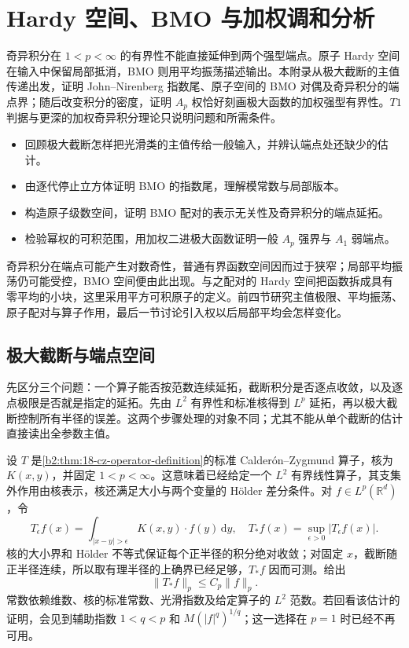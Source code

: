 \chapter{Hardy 空间、BMO 与加权调和分析}
\label{b2:app:C}

\begin{chapterabstract}
奇异积分在 \(1<p<\infty\) 的有界性不能直接延伸到两个强型端点。原子 Hardy 空间在输入中保留局部抵消，BMO 则用平均振荡描述输出。本附录从极大截断的主值传递出发，证明 John--Nirenberg 指数尾、原子空间的 BMO 对偶及奇异积分的端点界；随后改变积分的密度，证明 \(A_p\) 权恰好刻画极大函数的加权强型有界性。\(T1\) 判据与更深的加权奇异积分理论只说明问题和所需条件。
\end{chapterabstract}

\begin{learninggoals}\begin{itemize}
\item\label{b2:item:app-C-goal-1}回顾极大截断怎样把光滑类的主值传给一般输入，并辨认端点处还缺少的估计。
\item\label{b2:item:app-C-goal-2}由逐代停止立方体证明 BMO 的指数尾，理解模常数与局部版本。
\item\label{b2:item:app-C-goal-3}构造原子级数空间，证明 BMO 配对的表示无关性及奇异积分的端点延拓。
\item\label{b2:item:app-C-goal-4}检验幂权的可积范围，用加权二进极大函数证明一般 \(A_p\) 强界与 \(A_1\) 弱端点。
\end{itemize}\end{learninggoals}

奇异积分在端点可能产生对数奇性，普通有界函数空间因而过于狭窄；局部平均振荡仍可能受控，BMO 空间便由此出现。与之配对的 Hardy 空间把函数拆成具有零平均的小块，这里采用平方可积原子的定义。前四节研究主值极限、平均振荡、原子配对与算子作用，最后一节讨论引入权以后局部平均会怎样变化。

\section{极大截断与端点空间}
\label{b2:sec:app-C-1}

先区分三个问题：一个算子能否按范数连续延拓，截断积分是否逐点收敛，以及逐点极限是否就是指定的延拓。先由 \(L^2\) 有界性和标准核得到 \(L^p\) 延拓，再以极大截断控制所有半径的误差。这两个步骤处理的对象不同；尤其不能从单个截断的估计直接读出全参数主值。

\ProseParagraphBreak

设 \(T\) 是\cref{b2:thm:18-cz-operator-definition}的标准 Calderón--Zygmund 算子，核为 \(K(x,y)\)，并固定 \(1<p<\infty\)。这意味着已经给定一个 \(L^2\) 有界线性算子，其支集外作用由核表示，核还满足大小与两个变量的 Hölder 差分条件。对 \(f\in L^p(\mathbb R^d)\)，令
\[
 T_\epsilon f(x)=\int_{|x-y|>\epsilon}K(x,y)\cdot f(y)\,\mathrm dy,
 \quad T_*f(x)=\sup_{\epsilon>0}|T_\epsilon f(x)|.
\]
核的大小界和 Hölder 不等式保证每个正半径的积分绝对收敛；对固定 \(x\)，截断随正半径连续，所以取有理半径的上确界已经足够，\(T_*f\) 因而可测。给出
\[
 \|T_*f\|_p\leq C_p\|f\|_p.
\]
常数依赖维数、核的标准常数、光滑指数及给定算子的 \(L^2\) 范数。若回看该估计的证明，会见到辅助指数 \(1<q<p\) 和 \(M(|f|^q)^{1/q}\)；这一选择在 \(p=1\) 时已经不再可用。

